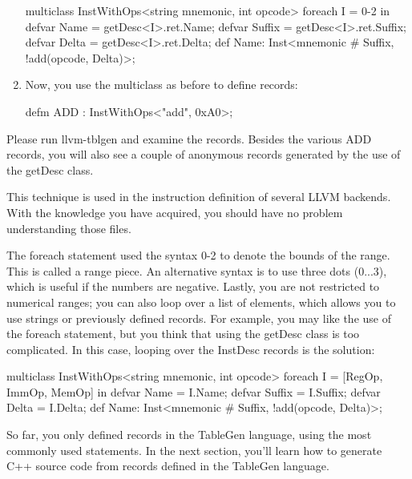 \begin{enumerate}
\begin{shell}
multiclass InstWithOps<string mnemonic, int opcode> {
    foreach I = 0-2 in {
        defvar Name = getDesc<I>.ret.Name;
        defvar Suffix = getDesc<I>.ret.Suffix;
        defvar Delta = getDesc<I>.ret.Delta;
        def Name: Inst<mnemonic # Suffix,
                            !add(opcode, Delta)>;
    }
}
\end{shell}

\item
Now, you use the multiclass as before to define records:

\begin{shell}
defm ADD : InstWithOps<"add", 0xA0>;
\end{shell}
\end{enumerate}

Please run llvm-tblgen and examine the records. Besides the various ADD records, you will also see a couple of anonymous records generated by the use of the getDesc class.

This technique is used in the instruction definition of several LLVM backends. With the knowledge you have acquired, you should have no problem understanding those files.

The foreach statement used the syntax 0-2 to denote the bounds of the range. This is called a range piece. An alternative syntax is to use three dots (0...3), which is useful if the numbers are negative. Lastly, you are not restricted to numerical ranges; you can also loop over a list of elements, which allows you to use strings or previously defined records. For example, you may like the use of the foreach statement, but you think that using the getDesc class is too complicated. In this case, looping over the InstDesc records is the solution:

\begin{shell}
multiclass InstWithOps<string mnemonic, int opcode> {
    foreach I = [RegOp, ImmOp, MemOp] in {
        defvar Name = I.Name;
        defvar Suffix = I.Suffix;
        defvar Delta = I.Delta;
        def Name: Inst<mnemonic # Suffix, !add(opcode, Delta)>;
    }
}
\end{shell}

So far, you only defined records in the TableGen language, using the most commonly used statements. In the next section, you’ll learn how to generate C++ source code from records defined in the TableGen language.




